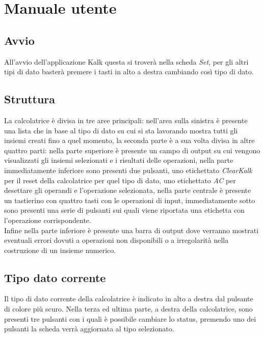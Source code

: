 \documentclass[a4paper,10pt]{article}
\begin{document}
        \section{Manuale utente}
        \subsection{Avvio}
        All’avvio dell’applicazione Kalk questa si troverà nella scheda \textit{Set}, per gli altri tipi di dato basterà premere i tasti in alto a destra cambiando così tipo di dato.
        \subsection{Struttura}
        La calcolatrice è divisa in tre aree principali: nell’area sulla sinistra è presente una lista che in base al tipo di dato su cui si sta lavorando mostra tutti gli insiemi creati fino a quel momento, la seconda parte è a sua volta divisa in altre quattro parti: nella parte superiore è presente un campo di output su cui vengono visualizzati gli insiemi selezionati e i risultati delle operazioni, nella parte immediatamente inferiore sono presenti due pulsanti, uno etichettato \textit{ClearKalk} per il reset della calcolatrice per quel tipo di dato, uno etichettato \textit{AC} per desettare gli operandi e l'operazione selezionata, nella parte centrale è presente un tastierino con quattro tasti con le operazioni di input, immediatamente sotto sono presenti una serie di pulsanti sui quali viene riportata una etichetta con l’operazione corrispondente.\\
        Infine nella parte inferiore è presente una barra di output dove verranno mostrati eventuali errori dovuti a operazioni non disponibili o a irregolarità nella costruzione di un insieme numerico.
        \subsection{Tipo dato corrente}
        Il tipo di dato corrente della calcolatrice è indicato in alto a destra dal pulsante di colore più scuro.
        Nella terza ed ultima parte, a destra della calcolatrice, sono presenti tre pulsanti con i quali è possibile cambiare lo status, premendo uno dei pulsanti la scheda verrà aggiornata al tipo selezionato. 
\end{document}
